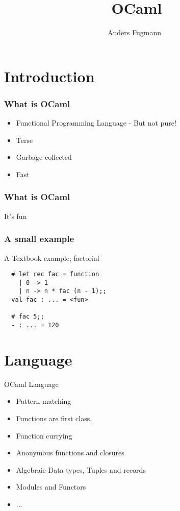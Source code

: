 \documentclass[xcolor=svgnames]{beamer}
\renewcommand{\_}{\mathunderscore}
\begin{document}
\title[OCaml overview]{\
  OCaml
}
\author[Anders Fugmann]{\
  \normalfont Anders Fugmann
}
\date{}

\maketitle

\section{Introduction}

\begin{frame}[fragile]
  \frametitle{What is OCaml}
  \pause
   \begin{itemize}
   \item Functional Programming Language - But not pure!
  \pause
   \item Terse
  \pause
   \item Garbage collected
  \pause
   \item Fast
   \end{itemize}
\end{frame}

\begin{frame}[fragile]
  \frametitle{What is OCaml}
  \begin{center}
    \Huge It's fun
  \end{center}
\end{frame}

\begin{frame}[fragile]
  \frametitle{A small example}
  A Textbook example; factorial
  \begin{lstlisting}
  # let rec fac = function
    | 0 -> 1
    | n -> n * fac (n - 1);;
  val fac : ... = <fun>

  # fac 5;;
  - : ... = 120

  \end{lstlisting}
\end{frame}

\section{Language}
\begin{frame}
  OCaml Language
  \begin{itemize}
  \item Pattern matching
  \item Functions are first class.
  \item Function currying
  \item Anonymous functions and closures
  \item Algebraic Data types, Tuples and records
  \item Modules and Functors
  \item ...
  \end{itemize}
\end{frame}
\end{document}
